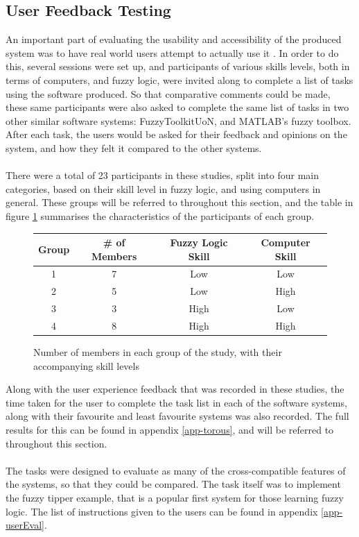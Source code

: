 \subsection{User Feedback Testing}
\vspace{-2mm}
\label{sec:uft}
An important part of evaluating the usability and accessibility of the produced system was to have real world users attempt to actually use it \cite{nielsen1992usability}. In order to do this, several sessions were set up, and participants of various skills levels, both in terms of computers, and fuzzy logic, were invited along to complete a list of tasks using the software produced. So that comparative comments could be made, these same participants were also asked to complete the same list of tasks in two other similar software systems: FuzzyToolkitUoN, and MATLAB's fuzzy toolbox. After each task, the users would be asked for their feedback and opinions on the system, and how they felt it compared to the other systems.\ \\
\ \\
There were a total of 23 participants in these studies, split into four main categories, based on their skill level in fuzzy logic, and using computers in general. These groups will be referred to throughout this section, and the table in figure \ref{fig:skill-table} summarises the characteristics of the participants of each group. 

\begin{figure}[ht!]
\begin{center}
\begin{tabular}{cccc}
\hline
\textbf{Group} 	& \textbf{\# of Members} & \textbf{Fuzzy Logic Skill} & \textbf{Computer Skill} \\
\hline
1				& 7 						 & Low			& Low		\\	
2				& 5  						 & Low			& High		\\
3				& 3 						 & High			& Low 		\\
4				& 8 						 & High 		& High		\\
\hline
\end{tabular}
\end{center}
\captionsetup{justification=centering,margin=2cm}
\vspace{-4mm}
\caption{Number of members in each group of the study, with their accompanying skill levels}
\label{fig:skill-table}
\vspace{-2mm}
\end{figure}
\noindent 
Along with the user experience feedback that was recorded in these studies, the time taken for the user to complete the task list in each of the software systems, along with their favourite and least favourite systems was also recorded. The full results for this can be found in appendix \ref{app-torous}, and will be referred to throughout this section.\ \\
\ \\
The tasks were designed to evaluate as many of the cross-compatible features of the systems, so that they could be compared. The task itself was to implement the fuzzy tipper example, that is a popular first system for those learning fuzzy logic. The list of instructions given to the users can be found in appendix \ref{app-userEval}.

